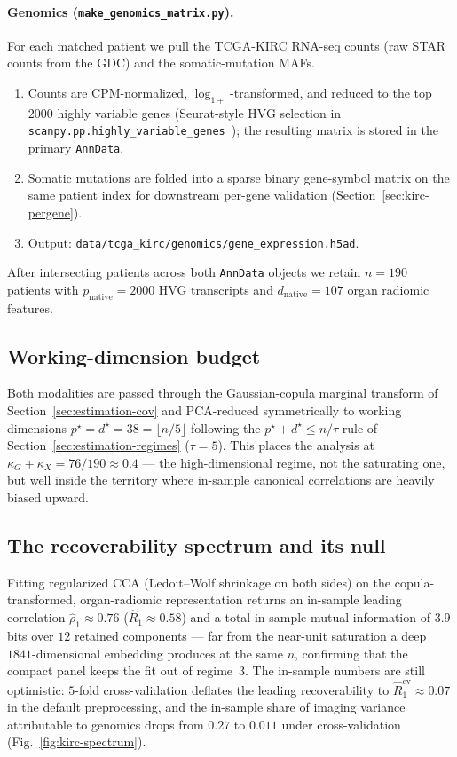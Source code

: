 \documentclass{article}
\begin{document}
\paragraph{Genomics (\texttt{make\_genomics\_matrix.py}).}
For each matched patient we pull the TCGA-KIRC RNA-seq counts (raw STAR counts
from the GDC) and the somatic-mutation MAFs.
\begin{enumerate}
\item Counts are CPM-normalized, $\log_{1+}$-transformed, and reduced to the
top $2000$ highly variable genes (Seurat-style HVG selection in
\texttt{scanpy.pp.highly\_variable\_genes}~\citep{wolf2018scanpy}); the resulting matrix is stored
in the primary \texttt{AnnData}.
\item Somatic mutations are folded into a sparse binary
gene-symbol matrix on the same patient index for downstream per-gene
validation (Section~\ref{sec:kirc-pergene}).
\item Output: \texttt{data/tcga\_kirc/genomics/gene\_expression.h5ad}.
\end{enumerate}
After intersecting patients across both \texttt{AnnData} objects we retain
$n = 190$ patients with $p_{\mathrm{native}} = 2000$ HVG transcripts and
$d_{\mathrm{native}} = 107$ organ radiomic features.

\subsection{Working-dimension budget}
\label{sec:kirc-cohort}
Both modalities are passed through the Gaussian-copula marginal transform of
Section~\ref{sec:estimation-cov} and PCA-reduced symmetrically to working
dimensions $p^\star = d^\star = 38 = \lfloor n / 5 \rfloor$ following the
$p^\star + d^\star \le n/\tau$ rule of
Section~\ref{sec:estimation-regimes} ($\tau = 5$). This places the analysis at
$\kappa_G + \kappa_X = 76/190 \approx 0.4$ --- the high-dimensional regime,
not the saturating one, but well inside the territory where in-sample
canonical correlations are heavily biased upward.

\subsection{The recoverability spectrum and its null}
\label{sec:kirc-spectrum}
Fitting regularized CCA (Ledoit--Wolf shrinkage on both sides) on the
copula-transformed, organ-radiomic representation returns an in-sample leading
correlation $\hat\rho_1 \approx 0.76$ ($\hat R_1 \approx 0.58$) and a total
in-sample mutual information of $3.9$ bits over $12$ retained components --- far
from the near-unit saturation a deep $1841$-dimensional embedding produces at
the same $n$, confirming that the compact panel keeps the fit out of regime~3.
The in-sample numbers are still optimistic: $5$-fold cross-validation deflates
the leading recoverability to $\hat R_1^{\mathrm{cv}} \approx 0.07$ in the
default preprocessing, and the in-sample share of imaging variance attributable
to genomics drops from $0.27$ to $0.011$ under cross-validation
(Fig.~\ref{fig:kirc-spectrum}).
\end{document}
